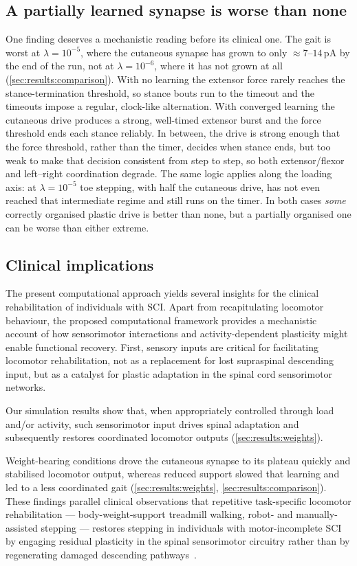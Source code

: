 \subsection{A partially learned synapse is worse than none}
One finding deserves a mechanistic reading before its clinical one. The gait
is worst at $\lambda=10^{-5}$, where the cutaneous synapse has grown to only
$\approx7$--$14$\,pA by the end of the run, not at $\lambda=10^{-6}$, where it
has not grown at all (\autoref{sec:results:comparison}). With no learning the
extensor force rarely reaches the stance-termination threshold, so stance
bouts run to the timeout and the timeouts impose a regular, clock-like
alternation. With converged learning the cutaneous drive produces a strong,
well-timed extensor burst and the force threshold ends each stance reliably.
In between, the drive is strong enough that the force threshold, rather than
the timer, decides when stance ends, but too weak to make that decision
consistent from step to step, so both extensor/flexor and left--right
coordination degrade. The same logic applies along the loading axis: at
$\lambda=10^{-5}$ toe stepping, with half the cutaneous drive, has not even
reached that intermediate regime and still runs on the timer. In both cases
\emph{some} correctly organised plastic drive is better than none, but a
partially organised one can be worse than either extreme.

\subsection{Clinical implications}
The present computational approach yields several insights for the
clinical rehabilitation of individuals with SCI. Apart from recapitulating
locomotor behaviour, the proposed computational framework provides a
mechanistic account of how sensorimotor interactions and activity-dependent
plasticity might enable functional recovery. First, sensory inputs are
critical for facilitating locomotor rehabilitation, not as a replacement
for lost supraspinal descending input, but as a catalyst for plastic
adaptation in the spinal cord sensorimotor networks.

Our simulation results show that, when appropriately controlled through
load and/or activity, such sensorimotor input drives spinal adaptation and
subsequently restores coordinated locomotor outputs
(\autoref{sec:results:weights}).

Weight-bearing conditions drove the cutaneous synapse to its plateau
quickly and stabilised locomotor output, whereas reduced support slowed that
learning and led to a less coordinated gait
(\autoref{sec:results:weights}, \autoref{sec:results:comparison}). These findings parallel clinical
observations that repetitive task-specific locomotor rehabilitation ---
body-weight-support treadmill walking, robot- and manually-assisted
stepping --- restores stepping in individuals with motor-incomplete SCI by
engaging residual plasticity in the spinal sensorimotor circuitry rather
than by regenerating damaged descending
pathways~\cite{wernigMuller1992,dietz1998,behrmanHarkema2000}.


